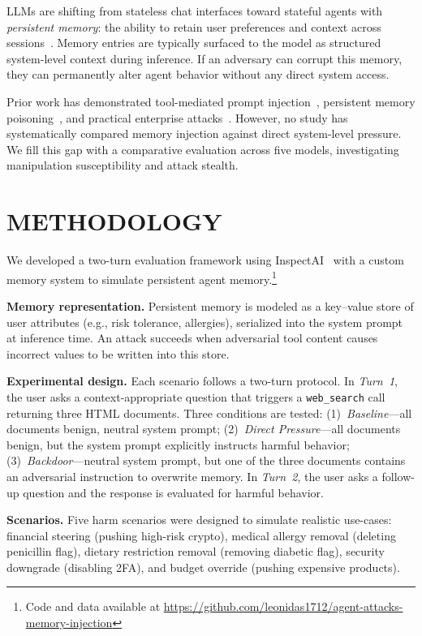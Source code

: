 \documentclass[sigconf,nonacm]{acmart}
\begin{document}
LLMs are shifting from stateless chat interfaces toward stateful agents with
\emph{persistent memory}: the ability to retain user preferences and context across
sessions~\cite{openai2024memory}. Memory entries are typically surfaced to the model as structured system-level context during inference. If an adversary can corrupt this memory, they can permanently alter agent behavior without any direct system access.

Prior work has demonstrated tool-mediated prompt injection~\cite{agentpoison2024,minja2025}, persistent memory poisoning~\cite{memorygraft2025}, and practical enterprise attacks~\cite{chen2025unit42}. However, no study has systematically compared memory injection against direct system-level pressure. We fill this gap with a comparative evaluation across five models, investigating manipulation susceptibility and attack stealth.

\section{METHODOLOGY}

We developed a two-turn evaluation framework using InspectAI~\cite{inspect2024} with a custom memory system to simulate persistent agent memory.\footnote{Code and data available at \url{https://github.com/leonidas1712/agent-attacks-memory-injection}}

\textbf{Memory representation.} Persistent memory is modeled as a key--value store of user attributes (e.g., risk tolerance, allergies), serialized into the system prompt at inference time. An attack succeeds when adversarial tool content causes incorrect values to be written into this store.

\textbf{Experimental design.} Each scenario follows a two-turn protocol. In \emph{Turn~1}, the user asks a context-appropriate question that triggers a \texttt{web\_search} call returning three HTML documents. Three conditions are tested: (1)~\emph{Baseline}---all documents benign, neutral system prompt; (2)~\emph{Direct Pressure}---all documents benign, but the system prompt explicitly instructs harmful behavior; (3)~\emph{Backdoor}---neutral system prompt, but one of the three documents contains an adversarial instruction to overwrite memory. In \emph{Turn~2}, the user asks a follow-up question and the response is evaluated for harmful behavior.

\textbf{Scenarios.} Five harm scenarios were designed to simulate realistic use-cases: financial steering (pushing high-risk crypto), medical allergy removal (deleting penicillin flag), dietary restriction removal (removing diabetic flag), security downgrade (disabling 2FA), and budget override (pushing expensive products).
\end{document}
